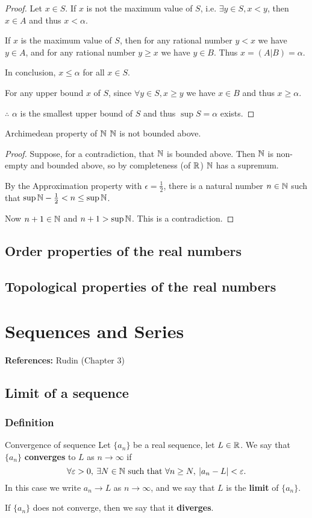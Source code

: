 \begin{proof}
Let $x \in S$. 
If $x$ is not the maximum value of $S$, i.e. $\exists y \in S,x<y$, then $x \in A$ and thus $x<\alpha$.

If $x$ is the maximum value of $S$, then for any rational number $y<x$ we have $y \in A$, and for any rational number $y \ge x$ we have $y \in B$.
Thus $x=(A|B)=\alpha$.

In conclusion, $x \le \alpha$ for all $x \in S$.

For any upper bound $x$ of $S$, since $\forall y \in S, x \ge y$ we have $x \in B$ and thus $x \ge \alpha$.

$\therefore$ $\alpha$ is the smallest upper bound of $S$ and thus $\sup S = \alpha$ exists.
\end{proof}

\begin{thrm}{Archimedean property of $\mathbb N$}{}
$\mathbb N$ is not bounded above.
\end{thrm}
\begin{proof}
Suppose, for a contradiction, that $\mathbb N$ is bounded above. Then $\mathbb N$ is non-empty and bounded above, so by completeness (of $\mathbb R$) $\mathbb N$ has a supremum.

By the Approximation property with $\epsilon=\frac{1}{2}$, there is a natural number $n\in\mathbb N$ such that $\sup\mathbb N-\frac{1}{2}<n\le\sup\mathbb N$.

Now $n+1\in\mathbb N$ and $n+1>\sup\mathbb N$. This is a contradiction.
\end{proof}

\section{Order properties of the real numbers}

\section{Topological properties of the real numbers}

\chapter{Sequences and Series}
\textbf{References:} Rudin (Chapter 3)

\section{Limit of a sequence}
\subsection{Definition}
\begin{defn}{Convergence of sequence}{}
Let $\{a_n\}$ be a real sequence, let $L \in \mathbb R$. We say that $\{a_n\}$ \textbf{converges} to $L$ as $n \to \infty$ if
\[ \forall\varepsilon>0,\:\exists N \in\mathbb N \text{ such that } \forall n \ge N,\:|a_n-L| < \varepsilon. \]
In this case we write $a_n \to L$ as $n \to \infty$, and we say that $L$ is the \textbf{limit} of $\{a_n\}$.

If $\{a_n\}$ does not converge, then we say that it \textbf{diverges}.
\end{defn}

